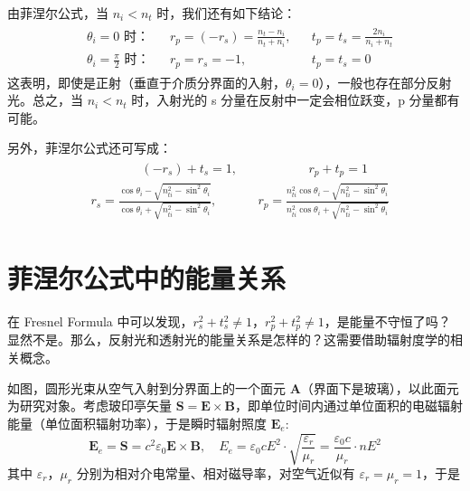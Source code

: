 \documentclass[UTF8]{report}
\theoremstyle{MyLineTheoremStyle} %
\theoremstyle{MyBlockTheoremStyle} %
\theoremstyle{MySubsubsectionStyle} %
\begin{document}
由菲涅尔公式，当 $n_i < n_t$ 时，我们还有如下结论：
\begin{gather}
    \begin{aligned}
        &\text{$\theta_i = 0$ 时：} &&r_p = (-r_s)  = \frac{n_t - n_i}{n_t + n_i}, &&t_p = t_s = \frac{2n_i}{n_i + n_t} \\ 
        &\text{$\theta_i = \frac{\pi}{2}$ 时：} &&r_p = r_s  = -1,&&t_p = t_s  =0
    \end{aligned}
\end{gather}
这表明，即使是正射（垂直于介质分界面的入射，$\theta_i = 0$），一般也存在部分反射光。总之，当 $n_i < n_t$ 时，入射光的 s 分量在反射中一定会相位跃变，p 分量都有可能。

另外，菲涅尔公式还可写成：
\begin{gather}
\boxed{
\begin{aligned}
    &\quad\quad \quad \quad   (-r_s) + t_s  = 1, &&\quad 
    \quad \quad\quad   r_p + t_p = 1 
    \\ 
    &r_s = \frac{\cos \theta_i - \sqrt{n_{ti}^2 - \sin^2 \theta_i} }{\cos \theta_i + \sqrt{n_{ti}^2 - \sin^2 \theta_i}}, && r_p = \frac{n_{ti}^2\cos \theta_i - \sqrt{n_{ti}^2 - \sin^2 \theta_i} }{n_{ti}^2\cos \theta_i + \sqrt{n_{ti}^2 - \sin^2 \theta_i}}
\end{aligned}
}
\end{gather}


\section{菲涅尔公式中的能量关系}

在 Fresnel Formula 中可以发现，$r_s^2 + t_s^2 \ne 1$，$r_p^2 + t_p^2 \ne 1$，是能量不守恒了吗？显然不是。那么，反射光和透射光的能量关系是怎样的？这需要借助辐射度学的相关概念。

如图，圆形光束从空气入射到分界面上的一个面元 $\boldsymbol{A}$（界面下是玻璃），以此面元为研究对象。考虑玻印亭矢量 $\boldsymbol{S} = \boldsymbol{E} \times \boldsymbol{B}$，即单位时间内通过单位面积的电磁辐射能量（单位面积辐射功率），于是瞬时辐射照度 $\boldsymbol{E}_e$: 
\begin{equation}
\boldsymbol{E}_e = \boldsymbol{S} = c^2 \varepsilon_0 \boldsymbol{E} \times \boldsymbol{B},\quad  E_e = \varepsilon_0 cE^2 \cdot \sqrt{\frac{\varepsilon_r}{\mu_r}} = \frac{\varepsilon_0 c}{\mu_r}\cdot  nE^2
\end{equation}
其中 $\varepsilon_r$，$\mu_r$ 分别为相对介电常量、相对磁导率，对空气近似有 $\varepsilon_r = \mu_r = 1$，于是
\end{document}

